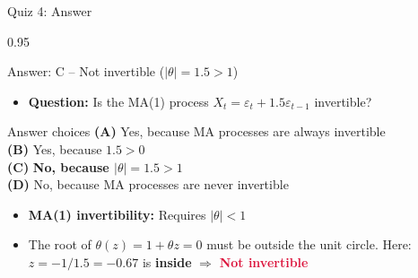 \documentclass[9pt, aspectratio=169, t]{beamer}
\begin{document}
\begin{frame}{Quiz 4: Answer}
    \begin{cminipage}{0.95\textwidth}
    \begin{exampleblock}{Answer: C -- Not invertible ($|\theta| = 1.5 > 1$)}
        \begin{itemize}\setlength{\itemsep}{0pt}
            \item \textbf{Question:} Is the MA(1) process $X_t = \varepsilon_t + 1.5\varepsilon_{t-1}$ invertible?
        \end{itemize}

        \vspace{0.3cm}

    \begin{block}{Answer choices}
        \textcolor{MainBlue}{\textbf{(A)}} Yes, because MA processes are always invertible \incorrect\\[3pt]
        \textcolor{MainBlue}{\textbf{(B)}} Yes, because $1.5 > 0$ \incorrect\\[3pt]
        \textcolor{MainBlue}{\textbf{(C)}} \textbf{\textcolor{Forest}{No, because $|\theta| = 1.5 > 1$}} \correct\\[3pt]
        \textcolor{MainBlue}{\textbf{(D)}} No, because MA processes are never invertible \incorrect
    \end{block}

        \vspace{0.3cm}

        \begin{itemize}
            \item \textbf{MA(1) invertibility:} Requires $|\theta| < 1$
            \item The root of $\theta(z) = 1 + \theta z = 0$ must be outside the unit circle. Here: $z = -1/1.5 = -0.67$ is \textbf{inside} $\Rightarrow$ \textcolor{Crimson}{\textbf{Not invertible}}
        \end{itemize}
    \end{exampleblock}

    \end{cminipage}
\end{frame}
\end{document}
